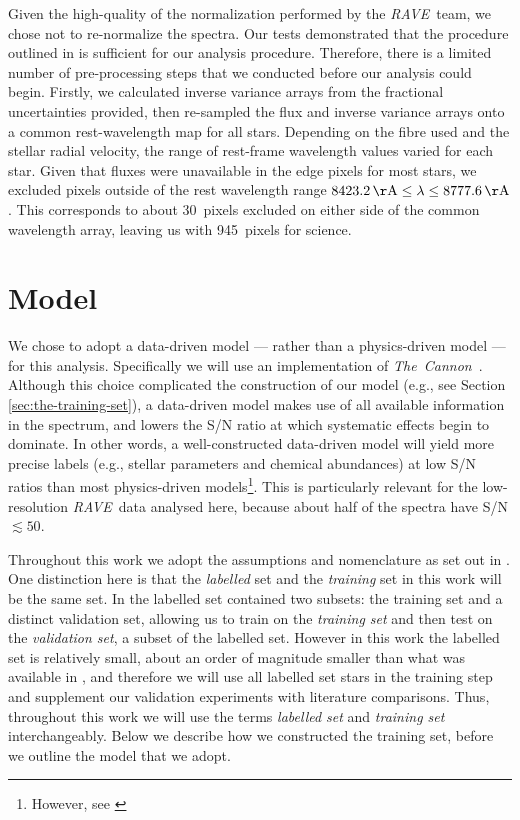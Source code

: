 \documentclass[preprint,trackchanges]{aastex}
\newcommand{\project}[1]{\textsl{#1}}
\newcommand{\thecannon}{\project{The~Cannon}}
\newcommand{\rave}{\project{\acronym{RAVE}}}
\newcommand{\acronym}[1]{{\small{#1}}}
\begin{document}
Given the high-quality of the normalization performed by the \rave\ team, we chose
not to re-normalize the spectra.  Our tests demonstrated that the procedure 
outlined in \citet{Kunder_2016} is sufficient for our analysis procedure. Therefore,
there is a limited number of pre-processing steps that we conducted before our
analysis could begin.  Firstly, we calculated inverse variance arrays from the
fractional uncertainties provided, then re-sampled the flux and inverse variance
arrays onto a common rest-wavelength map for all stars.  Depending on the fibre 
used and the stellar radial velocity, the range of rest-frame wavelength values
varied for each star.  Given that fluxes were unavailable in the edge pixels for 
most stars, we excluded pixels outside of the rest wavelength range 
$8423.2\,{\rm \AA} \le \lambda \le 8777.6\,{\rm \AA}$.  This corresponds to about
30~pixels excluded on either side of the common wavelength array, leaving us with
945~pixels for science.


\section{Model}
\label{sec:model}

We chose to adopt a data-driven model --- rather than a physics-driven model ---
for this analysis.  Specifically we will use an implementation of \thecannon\
\citep{Ness_2015,Ness_2016}.  Although this choice complicated the construction 
of our model (e.g., see Section \ref{sec:the-training-set}), a data-driven model 
makes use of all available information in the spectrum, and lowers the S/N ratio 
at which systematic effects begin to dominate.  In other words, a well-constructed
data-driven model will yield more precise labels (e.g., stellar parameters and
chemical abundances) at low S/N ratios than most physics-driven models\footnote{
However, see \citet{Casey_2016a}}.  This is particularly relevant for the 
low-resolution \rave\ data analysed here, because about half of the spectra have
S/N $\lesssim 50$. 


Throughout this work we adopt the assumptions and nomenclature as set out in
\citet{Casey_2016b}.  One distinction here is that the \emph{labelled} set and
the \emph{training} set in this work will be the same set.  In \citet{Casey_2016b}
the labelled set contained two subsets: the training set and a distinct
validation set, allowing us to train on the \emph{training set} and then test
on the \emph{validation set}, a subset of the labelled set.  However in this work
the labelled set is relatively small, about an order of magnitude smaller than 
what was available in \citet{Casey_2016b}, and therefore we will use all labelled 
set stars in the training step and supplement our validation experiments with 
literature comparisons.  Thus, throughout this work we will use the terms 
\emph{labelled set} and \emph{training set} interchangeably.  Below we describe 
how we constructed the training set, before we outline the model that we adopt.
\end{document}
